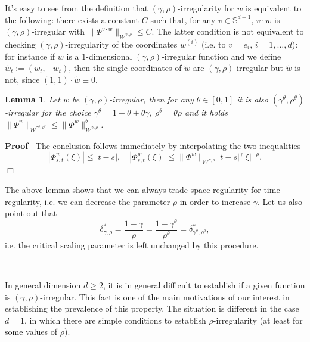\documentclass[10pt]{article}
\newcommand{\assign}{:=}
\newenvironment{proof}{\noindent\textbf{Proof\ }}{\hspace*{\fill}$\Box$\medskip}
\newtheorem{lemma}[theorem]{Lemma}
\begin{document}
\begin{remark}
  It's easy to see from the definition that $(\gamma,
  \rho)$\mbox{-}irregularity for $w$ is equivalent to the following: there
  exists a constant $C$ such that, for any $v \in \mathbb{S}^{d - 1}$, $v
  \cdot w$ is $(\gamma, \rho)$\mbox{-}irregular with $\| \Phi^{v \cdot w}
  \|_{\mathcal{W}^{\gamma, \rho}} \leqslant C.$ The latter condition is not
  equivalent to checking $(\gamma, \rho)$\mbox{-}irregularity of the
  coordinates $w^{(i)}$ (i.e. to $v = e_i$, $i = 1, \ldots, d$): for instance
  if $w$ is a $1$\mbox{-}dimensional $(\gamma, \rho)$-irregular function and
  we define $\tilde{w}_t \assign (w_t, - w_t)$, then the single coordinates of
  $\tilde{w}$ are $(\gamma, \rho)$-irregular but $\tilde{w}$ is not, since
  $(1, 1) \cdot \tilde{w} \equiv 0$.
\end{remark}

\begin{lemma}
  \label{sec2.2 lemma interpolation rho irr}Let $w$ be $(\gamma,
  \rho)$\mbox{-}irregular, then for any $\theta \in [0, 1]$ it is also
  $(\gamma^{\theta}, \rho^{\theta})$\mbox{-}irregular for the choice
  $\gamma^{\theta} = 1 - \theta + \theta \gamma$, $\rho^{\theta} = \theta
  \rho$ and it holds $\| \Phi^w \|_{\mathcal{W}^{\gamma^{\theta},
  \rho^{\theta}}} \leqslant \| \Phi^w \|^{\theta}_{\mathcal{W}^{\gamma,
  \rho}}$.
\end{lemma}

\begin{proof}
  The conclusion follows immediately by interpolating the two inequalities
  \[ | \Phi^w_{s, t} (\xi) | \leqslant | t - s |, \quad | \Phi^w_{s, t} (\xi)
     | \leqslant \| \Phi^w \|_{\mathcal{W}^{\gamma, \rho}} | t - s |^{\gamma}
     | \xi |^{- \rho} . \]
\end{proof}

The above lemma shows that we can always trade space regularity for time
regularity, i.e. we can decrease the parameter $\rho$ in order to increase
$\gamma$. Let us also point out that
\[ \delta^{\ast}_{\gamma, \rho} = \frac{1 - \gamma}{\rho} = \frac{1 -
   \gamma^{\theta}}{\rho^{\theta}} = \delta^{\ast}_{\gamma^{\theta},
   \rho^{\theta}}, \]
i.e. the critical scaling parameter is left unchanged by this procedure.

\

In general dimension $d \geqslant 2$, it is in general difficult to establish
if a given function is $(\gamma, \rho)$\mbox{-}irregular. This fact is one of
the main motivations of our interest in establishing the prevalence of this
property. The situation is different in the case $d = 1$, in which there are
simple conditions to establish $\rho$\mbox{-}irregularity (at least for some
values of $\rho$).
\end{document}
